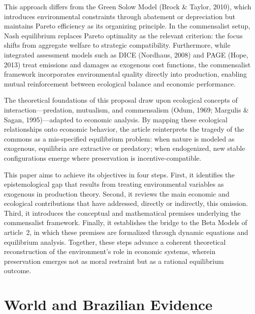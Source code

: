 \documentclass[a4paper,12pt,oneside,brazil,english]{abntex2}
\begin{document}
This approach differs from the Green Solow Model (Brock \& Taylor, 2010), which introduces environmental constraints through abatement or depreciation but maintains Pareto efficiency as its organizing principle. In the commensalist setup, Nash equilibrium replaces Pareto optimality as the relevant criterion: the focus shifts from aggregate welfare to strategic compatibility. Furthermore, while integrated assessment models such as DICE (Nordhaus, 2008) and PAGE (Hope, 2013) treat emissions and damages as exogenous cost functions, the commensalist framework incorporates environmental quality directly into production, enabling mutual reinforcement between ecological balance and economic performance.

The theoretical foundations of this proposal draw upon ecological concepts of interaction---predation, mutualism, and commensalism (Odum, 1969; Margulis \& Sagan, 1995)---adapted to economic analysis. By mapping these ecological relationships onto economic behavior, the article reinterprets the tragedy of the commons as a mis-specified equilibrium problem: when nature is modeled as exogenous, equilibria are extractive or predatory; when endogenized, new stable configurations emerge where preservation is incentive-compatible.

This paper aims to achieve its objectives in four steps. First, it identifies the epistemological gap that results from treating environmental variables as exogenous in production theory. Second, it reviews the main economic and ecological contributions that have addressed, directly or indirectly, this omission. Third, it introduces the conceptual and mathematical premises underlying the commensalist framework. %
Finally, it establishes the bridge to the Beta Models of article~2, in which these premises are formalized through dynamic equations and equilibrium analysis. Together, these steps advance a coherent theoretical reconstruction of the environment’s role in economic systems, wherein preservation emerges not as moral restraint but as a rational equilibrium outcome.


\section{World and Brazilian Evidence}
\end{document}
